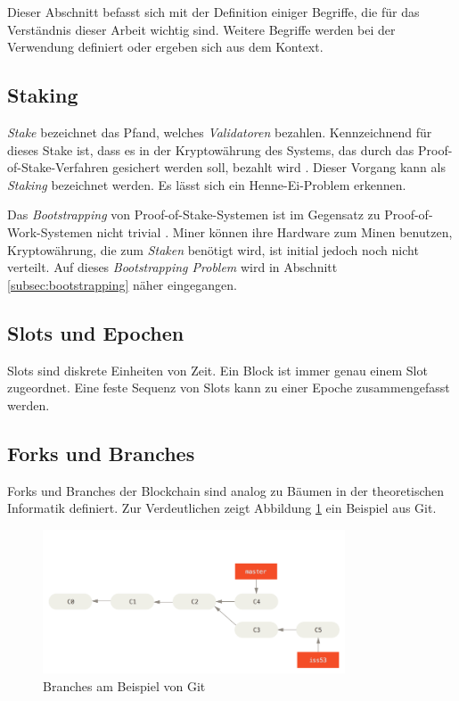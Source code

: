 Dieser Abschnitt befasst sich mit der Definition einiger Begriffe, die für das Verständnis dieser Arbeit wichtig sind. Weitere Begriffe werden bei der Verwendung definiert oder ergeben sich aus dem Kontext. 

\subsection{Staking}

\textit{Stake} bezeichnet das Pfand, welches \textit{Validatoren} bezahlen.
Kennzeichnend für dieses Stake ist, dass es in der Kryptowährung des Systems, das durch das Proof-of-Stake-Verfahren gesichert werden soll, bezahlt wird \cite[S. 1]{casper_ffg}. Dieser Vorgang kann als \textit{Staking} bezeichnet werden. Es lässt sich ein Henne-Ei-Problem erkennen.

Das \textit{Bootstrapping} von Proof-of-Stake-Systemen ist im Gegensatz zu Proof-of-Work-Systemen nicht trivial \cite[S. 2]{cwo_pow}. 
Miner können ihre Hardware zum Minen benutzen, Kryptowährung, die zum \textit{Staken} benötigt wird, ist initial jedoch noch nicht verteilt. 
Auf dieses \textit{Bootstrapping Problem} wird in Abschnitt \ref{subsec:bootstrapping} näher eingegangen.

\subsection{Slots und Epochen}

Slots sind diskrete Einheiten von Zeit. Ein Block ist immer genau einem Slot zugeordnet. Eine feste Sequenz von Slots kann zu einer Epoche zusammengefasst werden. 
\cite[S. 3ff.]{ouroboros}

\subsection{Forks und Branches}

Forks und Branches der Blockchain sind analog zu Bäumen in der theoretischen Informatik definiert. Zur Verdeutlichen zeigt Abbildung \ref{fig:branches} ein Beispiel aus Git.


\begin{figure}[htb] 
	\centerline{\includegraphics*[width=0.8\textwidth]{img/basic-branching-6}}
\caption{Branches am Beispiel von Git\protect\footnotemark}
\label{fig:branches}
\end{figure}

